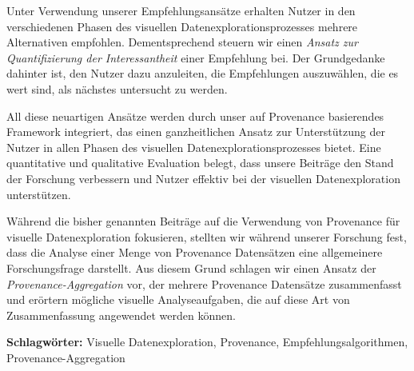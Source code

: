 Unter Verwendung unserer Empfehlungsans\"atze erhalten Nutzer in den verschiedenen Phasen des visuellen Datenexplorationsprozesses mehrere Alternativen empfohlen. Dementsprechend steuern wir einen \emph{Ansatz zur Quantifizierung der Interessantheit} einer Empfehlung bei. Der Grundgedanke dahinter ist, den Nutzer dazu anzuleiten, die Empfehlungen auszuw\"ahlen, die es wert sind, als n\"achstes untersucht zu werden.

All diese neuartigen Ans\"atze werden durch unser auf Provenance basierendes Framework integriert, das einen ganzheitlichen Ansatz zur Unterst\"utzung der Nutzer in allen Phasen des visuellen Datenexplorationsprozesses bietet. Eine quantitative und qualitative Evaluation belegt, dass unsere Beitr\"age den Stand der Forschung verbessern und Nutzer effektiv bei der visuellen Datenexploration unterst\"utzen.

W\"ahrend die bisher genannten Beitr\"age auf die Verwendung von Provenance f\"ur visuelle Datenexploration fokusieren, stellten wir w\"ahrend unserer Forschung fest, dass die Analyse einer Menge von Provenance Datens\"atzen eine allgemeinere Forschungsfrage darstellt. Aus diesem Grund schlagen wir einen Ansatz der \emph{Provenance-Aggregation} vor, der mehrere Provenance Datens\"atze zusammenfasst und er\"ortern m\"ogliche visuelle Analyseaufgaben, die auf diese Art von Zusammenfassung angewendet werden k\"onnen.

\smallskip 
\noindent \textbf{Schlagw\"orter: }Visuelle Datenexploration, Provenance, Empfehlungsalgorithmen, Provenance-Aggregation

